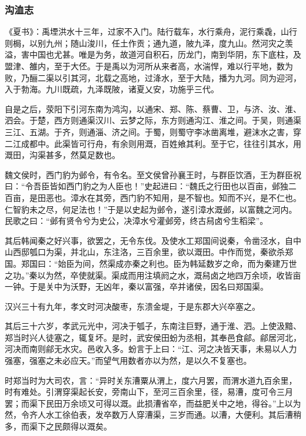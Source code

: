 \documentclass[]{article}
\begin{document}
\hypertarget{header-n2716}{%
\subsubsection{沟洫志}\label{header-n2716}}

《夏书》：禹堙洪水十三年，过家不入门。陆行载车，水行乘舟，泥行乘毳，山行则梮，以别九州；随山浚川，任土作贡；通九道，陂九泽，度九山。然河灾之羡溢，害中国也尤甚。唯是为务，故道河自积石，历龙门，南到华阴，东下底柱，及盟津、雒内，至于大伾。于是禹以为河所从来者高，水湍悍，难以行平地，数为败，乃酾二渠以引其河，北载之高地，过洚水，至于大陆，播为九河。同为迎河，入于勃海。九川既疏，九泽既陂，诸夏乂安，功施乎三代。

自是之后，荥阳下引河东南为鸿沟，以通宋、郑、陈、蔡曹、卫，与济、汝、淮、泗会。于楚，西方则通渠汉川、云梦之际，东方则通沟江、淮之间。于吴，则通渠三江、五湖。于齐，则通淄、济之间。于蜀，则蜀守李冰凿离堆，避沫水之害，穿二江成都中。此渠皆可行舟，有余则用溉，百姓飨其利。至于它，往往引其水，用溉田，沟渠甚多，然莫足数也。

魏文侯时，西门豹为邺令，有令名。至文侯曾孙襄王时，与群臣饮酒，王为群臣祝曰：``令吾臣皆如西门豹之为人臣也！''史起进曰：``魏氏之行田也以百亩，邺独二百亩，是田恶也。漳水在其旁，西门豹不知用，是不智也。知而不兴，是不仁也。仁智豹未之尽，何足法也！''于是以史起为邺令，遂引漳水溉邺，以富魏之河内。民歌之曰：``邺有贤令兮为史公，决漳水兮灌邺旁，终古舄卤兮生稻梁''。

其后韩闻秦之好兴事，欲罢之，无令东伐。及使水工郑国间说秦，令凿泾水，自中山西邸瓠口为渠，并北山，东注洛，三百余里，欲以溉田。中作而觉，秦欲杀郑国。郑国曰：``始臣为间，然渠成亦秦之利也。臣为韩延数岁之命，而为秦建万世之功。''秦以为然，卒使就渠。渠成而用注填阏之水，溉舄卤之地四万余顷，收皆亩一钟。于是关中为沃野，无凶年，秦以富强，卒并诸侯，因名曰郑国渠。

汉兴三十有九年，孝文时河决酸枣，东溃金堤，于是东郡大兴卒塞之。

其后三十六岁，孝武元光中，河决于瓠子，东南注巨野，通于淮、泗。上使汲黯、郑当时兴人徒塞之，辄复坏。是时，武安侯田蚡为丞相，其奉邑食鄃。鄃居河北，河决而南则鄃无水灾。邑收入多。蚡言于上曰：``江、河之决皆天事，未易以人力强塞，强塞之未必应天。''而望气用数者亦以为然，是以久不复塞也。

时郑当时为大司农，言：``异时关东漕粟从渭上，度六月罢，而渭水道九百余里，时有难处。引渭穿渠起长安，旁南山下，至河三百余里，径，易漕，度可令三月罢；而渠下民田万余顷又可得以溉。此损漕省卒，而益肥关中之地，得谷。''上以为然，令齐人水工徐伯表，发卒数万人穿漕渠，三岁而通。以漕，大便利。其后漕稍多，而渠下之民颇得以溉矣。
\end{document}
